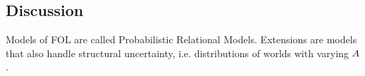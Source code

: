 %
%







\subsection{Discussion}

Models of FOL are called Probabilistic Relational Models. %
Extensions are models that also handle structural uncertainty, i.e. distributions of worlds with varying $A$.



